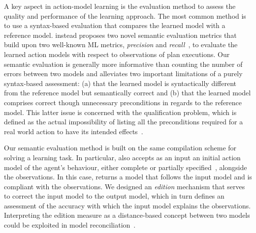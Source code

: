 A key aspect in action-model learning is the evaluation method to assess the quality and performance of the learning approach. The most common method is to use a syntax-based evaluation that compares the learned model with a reference model. \FAMA instead proposes two novel semantic evaluation metrics that build upon two well-known ML metrics, {\em precision} and {\em recall}~\cite{davis2006relationship}, to evaluate the learned action models with respect to observations of plan executions. Our semantic evaluation is generally more informative than counting the number of errors between two models and alleviates two important limitations of a purely syntax-based assessment: (a) that the learned model is syntactically different from the reference model but semantically correct and (b) that the learned model comprises correct though unnecessary preconditions in regards to the reference model. This latter issue is concerned with the qualification problem, which is defined as the actual impossibility of listing all the preconditions required for a real world action to have its intended effects~\cite{GinsbergS88}.

Our semantic evaluation method is built on the same compilation scheme for solving a learning task. In particular, \FAMA also accepts as an input an initial action model of the agent's behaviour, either complete or partially specified~\cite{ZhuoNK13,ZhuoK17}, alongside the observations. In this case, \FAMA returns a model that follows the input model and is compliant with the observations. We designed an {\em edition} mechanism that serves to correct the input model to the output model, which in turn defines an assessment of the accuracy with which the input model explains the observations. Interpreting the edition measure as a distance-based concept between two models could be exploited in model reconciliation~\cite{KulkarniCZVZK16}.



